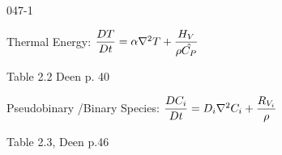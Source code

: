 \begin{mitframe}{047-1}
            
\begin{listone}
	\item Thermal Energy: $\dfrac{\elecdisplace\Temp}{\elecdisplace{t}}=\tdiff\nabla^2\Temp+\dfrac{\energysource}{\dens\hat{\cp}}$
    		\begin{listtwo}
            		\item Table 2.2 Deen p. 40
            \end{listtwo}
		\item Pseudobinary /Binary Species: $\dfrac{\elecdisplace\conc_{\state}}{\elecdisplace{t}}=\pdiff\nabla^2\conc_{\state}+\dfrac{\gasconst_{\vol_{\state}}}{\dens}$
        		\begin{listtwo}
                		\item Table 2.3, Deen p.46
                \end{listtwo}
	           
\end{listone}            
\end{mitframe}